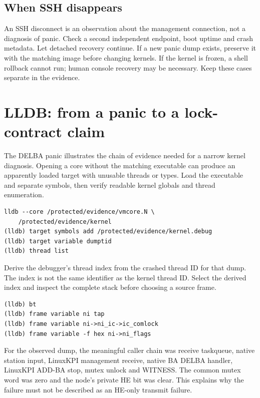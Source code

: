 \documentclass[11pt,letterpaper,oneside]{article}
\begin{document}
\subsection{When SSH disappears}
An SSH disconnect is an observation about the management connection, not a diagnosis of panic. Check a second independent endpoint, boot uptime and crash metadata. Let detached recovery continue. If a new panic dump exists, preserve it with the matching image before changing kernels. If the kernel is frozen, a shell rollback cannot run; human console recovery may be necessary. Keep these cases separate in the evidence.

\section{LLDB: from a panic to a lock-contract claim}
The DELBA panic illustrates the chain of evidence needed for a narrow kernel diagnosis. Opening a core without the matching executable can produce an apparently loaded target with unusable threads or types. Load the executable and separate symbols, then verify readable kernel globals and thread enumeration.

\begin{lstlisting}[caption={Debugger setup pattern; substitute preserved matching artifacts.}]
lldb --core /protected/evidence/vmcore.N \
    /protected/evidence/kernel
(lldb) target symbols add /protected/evidence/kernel.debug
(lldb) target variable dumptid
(lldb) thread list
\end{lstlisting}
Derive the debugger's thread index from the crashed thread ID for that dump. The index is not the same identifier as the kernel thread ID. Select the derived index and inspect the complete stack before choosing a source frame.

\begin{lstlisting}[caption={Typed inspection after selecting the actual crashed thread and callback frame.}]
(lldb) bt
(lldb) frame variable ni tap
(lldb) frame variable ni->ni_ic->ic_comlock
(lldb) frame variable -f hex ni->ni_flags
\end{lstlisting}
For the observed dump, the meaningful caller chain was receive taskqueue, native station input, LinuxKPI management receive, native BA DELBA handler, LinuxKPI ADD-BA stop, mutex unlock and WITNESS. The common mutex word was zero and the node's private HE bit was clear. This explains why the failure must not be described as an HE-only transmit failure.
\end{document}
